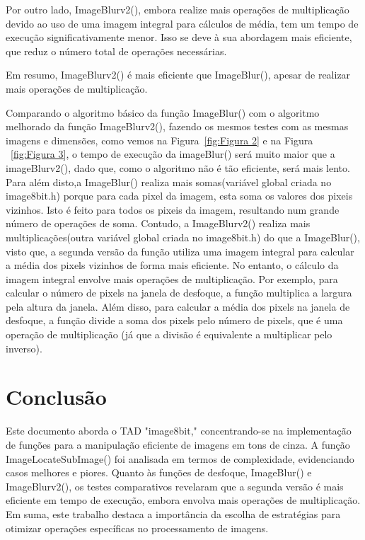 \documentclass{article}
\begin{document}
Por outro lado, ImageBlurv2(), embora realize mais operações de multiplicação devido ao uso de uma imagem integral para cálculos de média, tem um tempo de execução significativamente menor. Isso se deve à sua abordagem mais eficiente, que reduz o número total de operações necessárias.

Em resumo, ImageBlurv2() é mais eficiente que ImageBlur(), apesar de realizar mais operações de multiplicação.\\


Comparando o algoritmo básico da função ImageBlur() com o algoritmo melhorado da função ImageBlurv2(),
fazendo os mesmos testes com as mesmas imagens e dimensões, como vemos na Figura~\ref{fig:Figura 2} e na Figura ~\ref{fig:Figura 3}, 
o tempo de execução da imageBlur() será muito maior que a imageBlurv2(), dado que, como o algoritmo não é tão eficiente,
será mais lento. Para além disto,a ImageBlur() realiza mais somas(variável global criada no image8bit.h) porque para cada pixel da imagem, 
esta soma os valores dos pixeis vizinhos. Isto é feito para todos os pixeis da imagem, resultando
num grande número de operações de soma. Contudo, a ImageBlurv2() realiza mais multiplicações(outra variável global criada no image8bit.h)
do que a ImageBlur(), visto que, a segunda versão da função utiliza uma imagem integral para calcular
a média dos pixels vizinhos de forma mais eficiente. No entanto, o cálculo da imagem integral envolve
mais operações de multiplicação. Por exemplo, para calcular o número de pixels na janela de desfoque,
a função multiplica a largura pela altura da janela. Além disso, para calcular a média dos pixels na
janela de desfoque, a função divide a soma dos pixels pelo número de pixels, que é uma operação de 
multiplicação (já que a divisão é equivalente a multiplicar pelo inverso).\\








\section{Conclusão}
Este documento aborda o TAD "image8bit," concentrando-se na implementação de funções para a manipulação eficiente de imagens em 
tons de cinza. A função ImageLocateSubImage() foi analisada em termos de complexidade, evidenciando casos melhores e piores. Quanto às 
funções de desfoque, ImageBlur() e ImageBlurv2(), os testes comparativos revelaram que a segunda versão é mais eficiente em tempo de execução,
 embora envolva mais operações de multiplicação. Em suma, este trabalho destaca a importância da escolha de estratégias para otimizar operações
  específicas no processamento de imagens.
\end{document}

